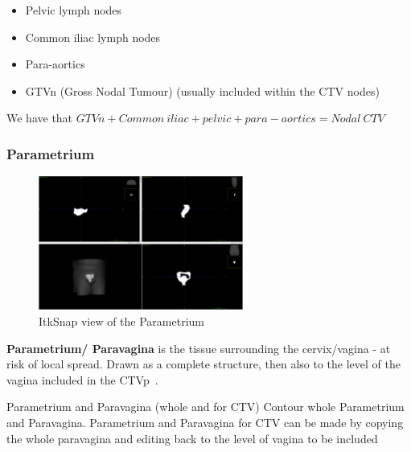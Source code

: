 \documentclass[11pt]{article}
\begin{document}
\begin{itemize}
    \item Pelvic lymph nodes
    \item Common iliac lymph nodes
    \item Para-aortics
    \item GTVn (Gross Nodal Tumour) (usually included within the CTV nodes)
\end{itemize}

We have that $GTVn + Common\ iliac + pelvic + para-aortics = Nodal\ CTV$

\subsubsection{Parametrium}

\begin{figure}[H]
    \centering
    \includegraphics[width=0.6\textwidth]{images/Parametrium.png}
    \caption{ItkSnap view of the Parametrium}\label{fig:CTVn}
\end{figure}

\textbf{Parametrium/ Paravagina} is the tissue surrounding the cervix/vagina - at risk of local spread. Drawn as a complete structure, then also to the level of the vagina included in the CTVp~\cite{AMLART-data}.

Parametrium and Paravagina (whole and for CTV)  Contour whole Parametrium and Paravagina. Parametrium and Paravagina for CTV can be made by copying the whole paravagina and editing back to the level of vagina to be included

\printbibliography %
\end{document}
